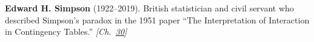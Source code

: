 \textbf{Edward H. Simpson} (1922–2019). British statistician and civil servant who described Simpson's paradox in the 1951 paper ``The Interpretation of Interaction in Contingency Tables.'' \emph{[Ch.~\hyperref[ch:simpsonsparadox]{30}]}

